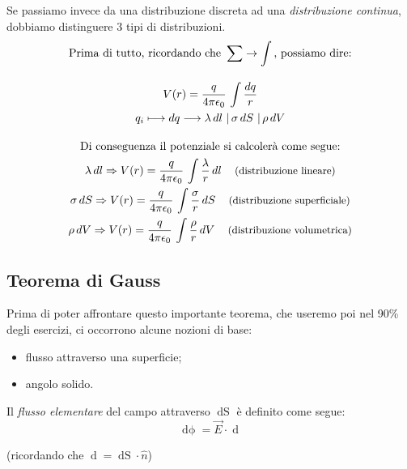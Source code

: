 \documentclass[a4paper,12pt,titlepage,openany]{book}
\theoremstyle{mydef}
\begin{document}
            Se passiamo invece da una distribuzione discreta ad una \emph{distribuzione continua},
            dobbiamo distinguere 3 tipi di distribuzioni.
            \begin{gather*}
                \text{Prima di tutto, ricordando che } \sum \rightarrow \int \text{, possiamo dire:}\\[1em]
                V(r)=\frac{q}{4\pi\epsilon_0}\,\int\frac{\mathop{dq}}{r}\\
                q_i\longmapsto \mathop{dq} \longrightarrow
                \lambda\mathop{dl}\,|\,\sigma\mathop{dS}\,|\,\rho\mathop{dV}\\[1em]
                \text{Di conseguenza il potenziale si calcolerà come segue:}\\
                \lambda\mathop{dl} \Rightarrow
                V(r)=\frac{q}{4\pi\epsilon_0}\,\int\frac{\lambda}{r}\mathop{dl}
                \quad\text{\small (distribuzione lineare)}\\
                \sigma\mathop{dS} \Rightarrow
                V(r)=\frac{q}{4\pi\epsilon_0}\,\int\frac{\sigma}{r}\mathop{dS}
                \quad\text{\small (distribuzione superficiale)}\\
                \rho\mathop{dV} \Rightarrow
                V(r)=\frac{q}{4\pi\epsilon_0}\,\int\frac{\rho}{r}\mathop{dV}
                \quad\text{\small (distribuzione volumetrica)}\\
            \end{gather*}
            
            \subsection{Teorema di Gauss}
            Prima di poter affrontare questo importante teorema, che useremo poi nel 90\% degli
            esercizi, ci occorrono alcune nozioni di base:
            \begin{itemize}
                \item{flusso attraverso una superficie;}
                \item{angolo solido.}
            \end{itemize}
            Il \emph{flusso elementare} del campo attraverso $\mathop{dS}$ è definito come segue:
            \begin{equation*}
                \mathop{d\phi} = \vec{E}\cdot\mathop{d\vec{S}}
            \end{equation*}
            \begin{center}
                (ricordando che $\mathop{d\vec{S}} = \mathop{dS}\cdot\hat{n}$)
            \end{center}
            
\end{document}
